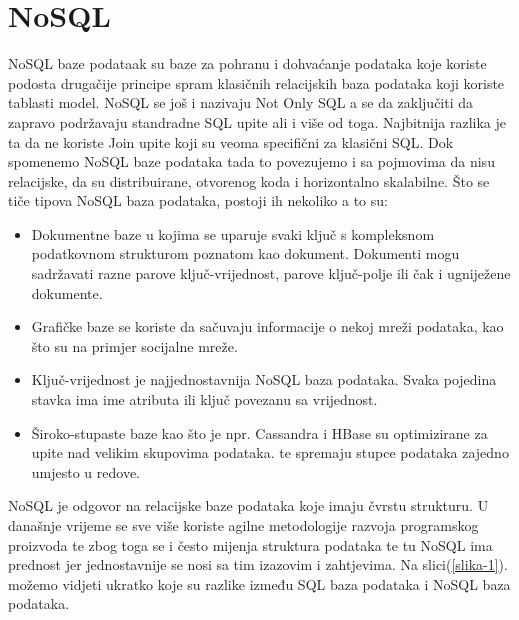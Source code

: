 \documentclass[a4paper,12pt]{foi}
\begin{document}
\chapter{NoSQL}
NoSQL baze podataak su baze za pohranu i dohvaćanje podataka koje koriste podosta drugačije principe spram klasičnih relacijskih baza podataka koji koriste tablasti model. NoSQL se još i nazivaju Not Only SQL a se da zaključiti da zapravo podržavaju standradne SQL upite ali i više od toga. Najbitnija razlika je ta da ne koriste Join upite koji su veoma specifični za klasični SQL. Dok spomenemo NoSQL baze podataka tada to povezujemo i sa pojmovima da nisu relacijske, da su distribuirane, otvorenog koda i horizontalno skalabilne.
Što se tiče tipova NoSQL baza podataka, postoji ih nekoliko a to su:
\begin{itemize}
\item Dokumentne baze u kojima se uparuje svaki ključ s kompleksnom podatkovnom strukturom poznatom kao dokument. Dokumenti mogu sadržavati razne parove ključ-vrijednost, parove ključ-polje ili čak i ugniježene dokumente.
\item Grafičke baze se koriste da sačuvaju informacije o nekoj mreži podataka, kao što su na primjer socijalne mreže.
\item Ključ-vrijednost je najjednostavnija NoSQL baza podataka. Svaka pojedina stavka ima ime atributa ili ključ povezanu sa vrijednost.
\item Široko-stupaste baze kao što je npr. Cassandra i HBase su optimizirane za upite nad velikim skupovima podataka. te spremaju stupce podataka zajedno umjesto u redove.
\end{itemize}

NoSQL je odgovor na relacijske baze podataka koje imaju čvrstu strukturu. U današnje vrijeme se sve više koriste agilne metodologije razvoja programskog proizvoda te zbog toga se i često mijenja struktura podataka te tu NoSQL ima prednost jer jednostavnije se nosi sa tim izazovim i zahtjevima. Na slici(\ref{slika-1}). možemo vidjeti ukratko koje su razlike između SQL baza podataka i NoSQL baza podataka. \citep{NoSQL}
\end{document}
